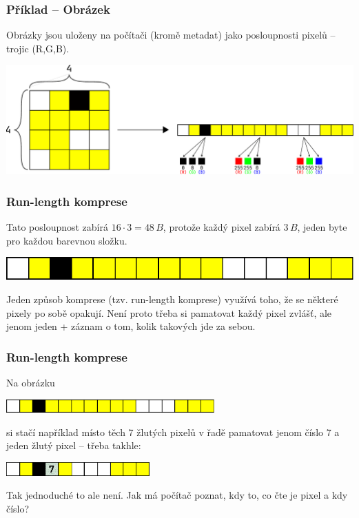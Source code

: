 \documentclass[aspectratio=169,11pt,svgnames]{beamer}
\begin{document}
\begin{frame}
 \frametitle{Příklad -- Obrázek}
 Obrázky jsou uloženy na počítači (kromě metadat) jako posloupnosti pixelů --
 trojic (R,G,B).
 \begin{center}
  \includegraphics[width=\textwidth]{image-3.pdf}
 \end{center}
\end{frame}

\begin{frame}
 \frametitle{Run-length komprese}
 Tato posloupnost zabírá $16 \cdot 3 = 48\,B$, protože každý pixel zabírá
 $3\,B$, jeden byte pro každou barevnou složku.
 \begin{center}
  \includegraphics[width=.5\textwidth]{image-4.pdf}
 \end{center}
 \pause
 Jeden způsob komprese (tzv. \alert{run-length} komprese) využívá toho, že
 se některé pixely po sobě opakují.
 \pause
 Není proto třeba si pamatovat každý pixel zvlášť, ale jenom jeden + záznam o
 tom, kolik takových jde za sebou.
\end{frame}

\begin{frame}
 \frametitle{Run-length komprese}
 Na obrázku
 \begin{center}
  \includegraphics[width=8cm]{image-4.pdf}
 \end{center}
 si stačí například místo těch 7 žlutých pixelů v řadě pamatovat jenom číslo 7 a
 jeden žlutý pixel -- třeba takhle:
 \begin{center}
  \includegraphics[width=5.5cm]{image-5.pdf}
 \end{center}
 \pause
 Tak jednoduché to ale není. Jak má počítač poznat, kdy to, co čte je pixel a
 kdy číslo?
\end{frame}
\end{document}
